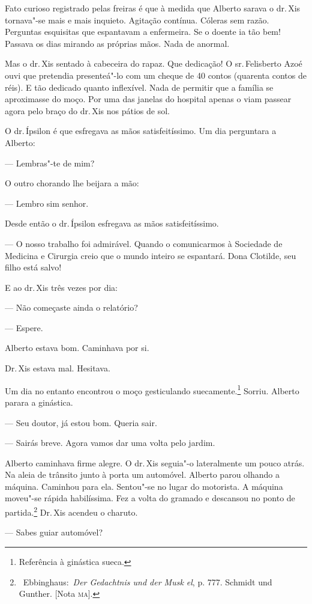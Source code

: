 Fato curioso registrado pelas freiras é que à medida que Alberto sarava
o dr.\,Xis tornava"-se mais e mais inquieto. Agitação contínua. Cóleras
sem razão. Perguntas esquisitas que espantavam a enfermeira. Se o doente
ia tão bem! Passava os dias mirando as próprias mãos. Nada de anormal.

Mas o dr.\,Xis sentado à cabeceira do rapaz. Que dedicação! O sr.\,Felisberto Azoé ouvi que pretendia presenteá"-lo com um cheque de 40
contos (quarenta contos de réis). E tão dedicado quanto inflexível. Nada
de permitir que a família se aproximasse do moço. Por uma das janelas do
hospital apenas o viam passear agora pelo braço do dr.\,Xis nos pátios de
sol.

O dr.\,Ípsilon é que esfregava as mãos satisfeitíssimo. Um dia perguntara
a Alberto:

--- Lembras"-te de mim?

O outro chorando lhe beijara a mão:

--- Lembro sim senhor.

Desde então o dr.\,Ípsilon esfregava as mãos satisfeitíssimo.

--- O nosso trabalho foi admirável. Quando o comunicarmos à Sociedade de
Medicina e Cirurgia creio que o mundo inteiro se espantará. Dona
Clotilde, seu filho está salvo!

E ao dr.\,Xis três vezes por dia:

--- Não começaste ainda o relatório?

--- Espere.

Alberto estava bom. Caminhava por si.

Dr.\,Xis estava mal. Hesitava.

Um dia no entanto encontrou o moço gesticulando suecamente.\footnote{Referência
  à ginástica sueca.} Sorriu. Alberto parara a ginástica.

--- Seu doutor, já estou bom. Queria sair.

--- Sairás breve. Agora vamos dar uma volta pelo jardim.

Alberto caminhava firme alegre. O dr.\,Xis seguia"-o lateralmente um pouco
atrás. Na aleia de trânsito junto à porta um automóvel. Alberto parou
olhando a máquina. Caminhou para ela. Sentou"-se no lugar do motorista. A
máquina moveu"-se rápida habilíssima. Fez a volta do gramado e descansou
no ponto de partida.\footnote{~Ebbinghaus:~\emph{Der Gedachtnis und der
  Musk el}, p. 777. Schmidt und Gunther. {[}Nota \textsc{ma}{]}.} Dr.\,Xis
acendeu o charuto.

--- Sabes guiar automóvel?

